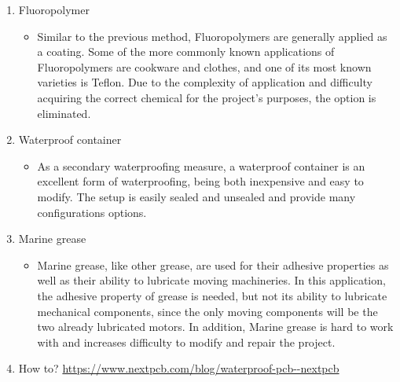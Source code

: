 \begin{enumerate}
\begin{itemize}
          \end{itemize}
    \item Fluoropolymer
          \begin{itemize}
              \item Similar to the previous method, Fluoropolymers are generally applied as a coating. Some of the more commonly known applications of Fluoropolymers are cookware and clothes, and one of its most known varieties is Teflon. Due to the complexity of application and difficulty acquiring the correct chemical for the project’s purposes, the option is eliminated.
          \end{itemize}
    \item Waterproof container
          \begin{itemize}
              \item As a secondary waterproofing measure, a waterproof container is an excellent form of waterproofing, being both inexpensive and easy to modify. The setup is easily sealed and unsealed and provide many configurations options.
          \end{itemize}
    \item Marine grease 
    \begin{itemize}
        \item Marine grease, like other grease, are used for their adhesive properties as well as their ability to lubricate moving machineries. In this application, the adhesive property of grease is needed, but not its ability to lubricate mechanical components, since the only moving components will be the two already lubricated motors. In addition, Marine grease is hard to work with and increases difficulty to modify and repair the project.
    \end{itemize}
    \item How to? \url{https://www.nextpcb.com/blog/waterproof-pcb--nextpcb}
\end{enumerate}







